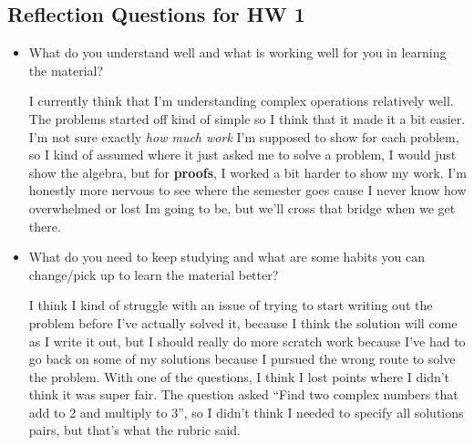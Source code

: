 \subsection*{Reflection Questions for HW 1}
    \begin{itemize}
        \item What do you understand well and what is working well for you in learning the material?

        \begin{reflection}
            I currently think that I'm understanding complex operations relatively well. The problems started off kind of simple so I think that it made it a bit easier. I'm not sure exactly \textit{how much work} I'm supposed to show for each problem, so I kind of assumed where it just asked me to solve a problem, I would just show the algebra, but for \textbf{proofs}, I worked a bit harder to show my work.\gline{}
            I'm honestly more nervous to see where the semester goes cause I never know how overwhelmed or lost Im going to be, but we'll cross that bridge when we get there. 
        \end{reflection}

        \item What do you need to keep studying and what are some habits you can change/pick up to learn the material better?

        \begin{reflection}
            I think I kind of struggle with an issue of trying to start writing out the problem before I've actually solved it, because I think the solution will come as I write it out, but I should really do more scratch work because I've had to go back on some of my solutions because I pursued the wrong route to solve the problem. \gline{}
            With one of the questions, I think I lost points where I didn't think it was super fair. The question asked ``Find two complex numbers that add to 2 and multiply to 3'', so I didn't think I needed to specify all solutions pairs, but that's what the rubric said. 
        \end{reflection}
    \end{itemize}
